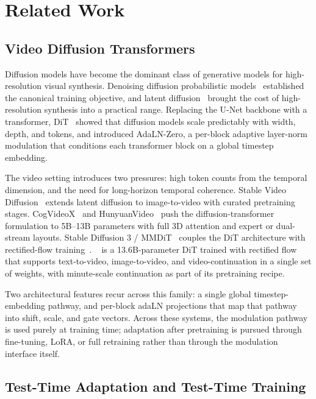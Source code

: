 \section{Related Work}
\label{sec:related}

\subsection{Video Diffusion Transformers}
\label{sec:rw_dits}

Diffusion models have become the dominant class of generative models for
high-resolution visual synthesis. Denoising diffusion probabilistic
models~\citep{ho2020ddpm} established the canonical training objective, and
latent diffusion~\citep{rombach2022ldm} brought the cost of high-resolution
synthesis into a practical range. Replacing the U-Net backbone with a
transformer, DiT~\citep{peebles2023dit} showed that diffusion models scale
predictably with width, depth, and tokens, and introduced AdaLN-Zero, a
per-block adaptive layer-norm modulation that conditions each transformer
block on a global timestep embedding.

The video setting introduces two pressures: high token counts from the
temporal dimension, and the need for long-horizon temporal coherence. Stable
Video Diffusion~\citep{blattmann2023svd} extends latent diffusion to
image-to-video with curated pretraining stages. CogVideoX~\citep{yang2024cogvideox}
and HunyuanVideo~\citep{kong2024hunyuanvideo} push the diffusion-transformer
formulation to 5B--13B parameters with full 3D attention and expert or
dual-stream layouts. Stable Diffusion 3 / MMDiT~\citep{esser2024sd3} couples
the DiT architecture with rectified-flow
training~\citep{lipman2023flowmatching}.
\backbone~\citep{meituan2025longcatvideo} is a 13.6B-parameter DiT trained
with rectified flow that supports text-to-video, image-to-video, and
video-continuation in a single set of weights, with minute-scale continuation
as part of its pretraining recipe.

Two architectural features recur across this family: a single global
timestep-embedding pathway, and per-block adaLN projections that map that
pathway into shift, scale, and gate vectors. Across these systems, the
modulation pathway is used purely at training time; adaptation after
pretraining is pursued through fine-tuning, LoRA, or full retraining rather
than through the modulation interface itself.

\subsection{Test-Time Adaptation and Test-Time Training}
\label{sec:rw_tta}

